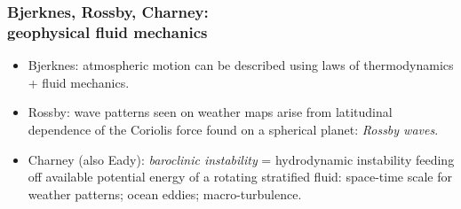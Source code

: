 \documentclass[10pt]{beamer}
\begin{document}
\begin{frame}
  \frametitle{Bjerknes, Rossby, Charney: \\ geophysical fluid mechanics}

\begin{center}
\vspace{-.25cm}
\hspace{1cm} 
\hspace{1cm} 

\vspace{-.3cm}

\end{center}

\begin{exampleblock}{}
\begin{itemize}

\item Bjerknes: atmospheric motion can be described using laws of
  thermodynamics + fluid mechanics.

\item Rossby: wave patterns seen on weather maps arise from
  latitudinal dependence of the Coriolis force found on a spherical
  planet: {\it Rossby waves}.

\item Charney (also Eady): {\it baroclinic instability} = hydrodynamic
  instability feeding off available potential energy of a rotating
  stratified fluid: space-time scale for weather patterns; ocean
  eddies; macro-turbulence.  


\end{itemize}
\end{exampleblock}{}
\end{frame}
\end{document}

